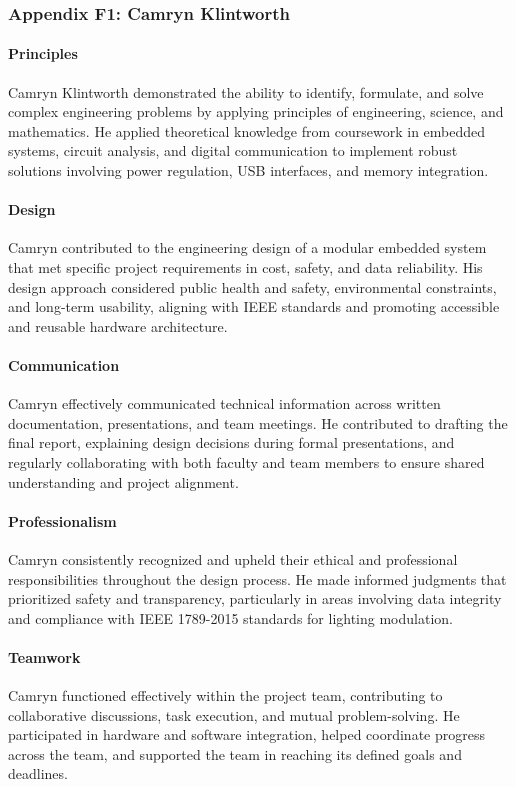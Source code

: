 \documentclass[../../main.tex]{subfiles}
\begin{document}
\subsubsection{Appendix F1: Camryn Klintworth}

\paragraph{Principles}
Camryn Klintworth demonstrated the ability to identify, formulate, and solve complex engineering problems by applying principles of engineering, science, and mathematics. He applied theoretical knowledge from coursework in embedded systems, circuit analysis, and digital communication to implement robust solutions involving power regulation, USB interfaces, and memory integration.

\paragraph{Design}
Camryn contributed to the engineering design of a modular embedded system that met specific project requirements in cost, safety, and data reliability. His design approach considered public health and safety, environmental constraints, and long-term usability, aligning with IEEE standards and promoting accessible and reusable hardware architecture.

\paragraph{Communication}
Camryn effectively communicated technical information across written documentation, presentations, and team meetings. He contributed to drafting the final report, explaining design decisions during formal presentations, and regularly collaborating with both faculty and team members to ensure shared understanding and project alignment.

\paragraph{Professionalism}
Camryn consistently recognized and upheld their ethical and professional responsibilities throughout the design process. He made informed judgments that prioritized safety and transparency, particularly in areas involving data integrity and compliance with IEEE 1789-2015 standards for lighting modulation.

\paragraph{Teamwork}
Camryn functioned effectively within the project team, contributing to collaborative discussions, task execution, and mutual problem-solving. He participated in hardware and software integration, helped coordinate progress across the team, and supported the team in reaching its defined goals and deadlines.
\end{document}
